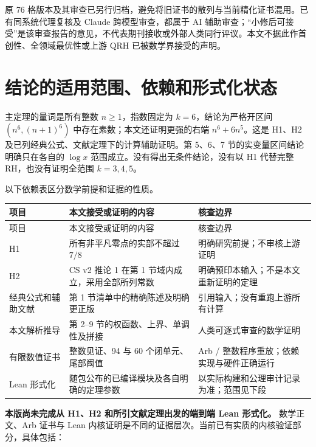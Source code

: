 \documentclass[UTF8,zihao=-4,fontset=fandol]{ctexart}
\begin{document}
原 76 格版本及其审查已另行归档，避免将旧证书的散列与当前精化证书混用。已有同系统代理复核及 Claude 跨模型审查，都属于 AI 辅助审查；“小修后可接受”是该审查报告的意见，不代表期刊接收或外部人类同行评议。本文不据此作首创性、全领域最优性或上游 QRH 已被数学界接受的声明。

\section{结论的适用范围、依赖和形式化状态}

主定理的量词是所有整数 \(n\ge1\)，指数固定为 \(k=6\)，结论为严格开区间 \((n^6,(n+1)^6)\) 中存在素数；本文还证明更强的右端 \(n^6+6n^5\)。这是 H1、H2 及已列经典公式、文献定理下的计算辅助证明。第 5、6、7 节的实变量区间结论明确只在各自的 \(\log x\) 范围成立。没有得出无条件结论，没有以 H1 代替完整 RH，也没有证明全范围 \(k=3,4,5\)。

以下依赖表区分数学前提和证据的性质。

\begingroup\small\setlength{\tabcolsep}{3pt}
\begin{longtable}{>{\raggedright\arraybackslash}p{}>{\raggedright\arraybackslash}p{}>{\raggedright\arraybackslash}p{}}
\toprule
项目 & 本文接受或证明的内容 & 核查边界 \\
\midrule\endfirsthead
\toprule
项目 & 本文接受或证明的内容 & 核查边界 \\
\midrule\endhead
\bottomrule\endfoot
H1 & 所有非平凡零点的实部不超过 \(7/8\) & 明确研究前提；不审核上游证明 \\
H2 & CS v2 推论 1 在第 1 节域内成立，采用全部所列常数 & 明确预印本输入；不是本文重新证明的定理 \\
经典公式和辅助文献 & 第 1 节清单中的精确陈述及明确更正版 & 引用输入；没有重跑上游所有计算 \\
本文解析推导 & 第 2--9 节的权函数、上界、单调性及拼接 & 人类可逐式审查的数学证明 \\
有限数值证书 & 整数见证、94 与 60 个闭单元、尾部阈值 & Arb / 整数程序重放；依赖实现与硬件正确运行 \\
Lean 形式化 & 随包公布的已编译模块及各自明确的定理参数 & 以实际构建和公理审计记录为准；范围见下段 \\
\end{longtable}
\endgroup

\textbf{本版尚未完成从 H1、H2 和所引文献定理出发的端到端 Lean 形式化。} 数学正文、Arb 证书与 Lean 内核证明是不同的证据层次。当前已有实质的内核验证部分，具体包括：
\end{document}
